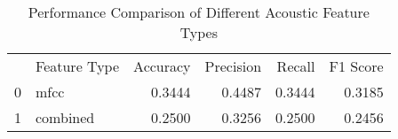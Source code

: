 \begin{table}[htbp]
\centering
\caption{Performance Comparison of Different Acoustic Feature Types}
\label{tab:feature_comparison}
\begin{tabular}{llrrrr}
 & Feature Type & Accuracy & Precision & Recall & F1 Score \\
0 & mfcc & 0.3444 & 0.4487 & 0.3444 & 0.3185 \\
1 & combined & 0.2500 & 0.3256 & 0.2500 & 0.2456 \\
\end{tabular}
\end{table}
